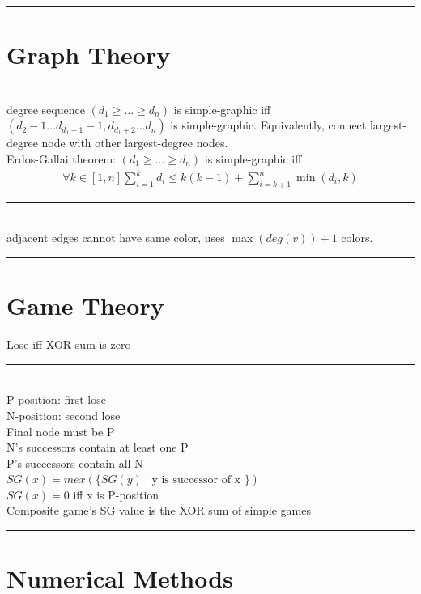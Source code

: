 \documentclass[10pt,landscape]{article}
\begin{document}
\noindent\rule{\linewidth}{1pt}

\section{Graph Theory}

 \\ degree sequence $(d_1 \ge \hdots \ge d_n)$ is simple-graphic iff $(d_2-1 \hdots d_{d_1+1}-1, d_{d_1+2} \hdots d_n)$ is simple-graphic. Equivalently, connect largest-degree node with other largest-degree nodes. \\
Erdos-Gallai theorem: $(d_1 \ge \hdots \ge d_n)$ is simple-graphic iff
\begin{align*}
	\forall k \in [1,n] \sum_{i=1}^{k}{d_i} \le k(k-1) + \sum_{i=k+1}^{n}{\min{(d_i, k)}}
\end{align*}

\noindent\rule{\linewidth}{1pt}

 \\ adjacent edges cannot have same color, uses $\max{(deg(v))} + 1$ colors. 

\noindent\rule{\linewidth}{1pt}

\section{Game Theory}

 Lose iff XOR sum is zero

\noindent\rule{\linewidth}{1pt}

 \\
P-position: first lose \\
N-position: second lose \\
Final node must be P \\
N's successors contain at least one P \\
P's successors contain all N \\
$SG(x) = mex(\{SG(y) \mid \text{y is successor of x }\})$ \\
$SG(x) = 0$ iff x is P-position \\
Composite game's SG value is the XOR sum of simple games

\noindent\rule{\linewidth}{1pt}

\section{Numerical Methods}
\end{document}

